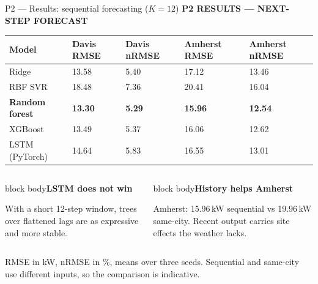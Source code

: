 \documentclass[aspectratio=169,11pt]{beamer}
\newcommand{\sectiontag}[1]{{\footnotesize\usebeamercolor[fg]{structure}\textbf{#1}}\par\vspace{0.10cm}}
\newcommand{\smallmuted}[1]{{\footnotesize\color{slate}#1\par}}
\newcommand{\factbox}[2]{\begin{beamercolorbox}[sep=0.13cm,wd=\linewidth]{block body}{\bfseries #1}\par\small #2\end{beamercolorbox}}
\begin{document}
\begin{frame}{P2 — Results: sequential forecasting ($K=12$)}
\sectiontag{P2 \quad RESULTS — NEXT-STEP FORECAST}
\small
\begin{tabularx}{\linewidth}{@{}P{3.0cm}YYYY@{}}\toprule
\textbf{Model} & \textbf{Davis RMSE} & \textbf{Davis nRMSE} & \textbf{Amherst RMSE} & \textbf{Amherst nRMSE}\\\midrule
Ridge & 13.58 & 5.40 & 17.12 & 13.46\\
RBF SVR & 18.48 & 7.36 & 20.41 & 16.04\\
\textbf{Random forest} & \textbf{13.30} & \textbf{5.29} & \textbf{15.96} & \textbf{12.54}\\
XGBoost & 13.49 & 5.37 & 16.06 & 12.62\\
LSTM (PyTorch) & 14.64 & 5.83 & 16.55 & 13.01\\
\bottomrule\end{tabularx}\par
\vspace{0.2cm}
\begin{columns}[T,totalwidth=\textwidth]
\begin{column}{0.48\textwidth}
\factbox{LSTM does not win}{With a short 12-step window, trees over flattened lags are as expressive and more stable.}
\end{column}
\begin{column}{0.48\textwidth}
\factbox{History helps Amherst}{Amherst: 15.96\,kW sequential vs 19.96\,kW same-city. Recent output carries site effects the weather lacks.}
\end{column}
\end{columns}
\smallmuted{RMSE in kW, nRMSE in \%, means over three seeds. Sequential and same-city use different inputs, so the comparison is indicative.}
\end{frame}
\end{document}
